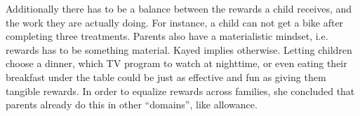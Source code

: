 Additionally there has to be a balance between the rewards a child receives, and the work they are actually doing. For instance, a child can not get a bike after completing three treatments. Parents also have a materialistic mindset, i.e. rewards has to be something material. Kayed implies otherwise. Letting children choose a dinner, which TV program to watch at nighttime, or even eating their breakfast under the table could be just as effective and fun as giving them tangible rewards. In order to equalize rewards across families, she concluded that parents already do this in other ``domains'', like allowance.   



